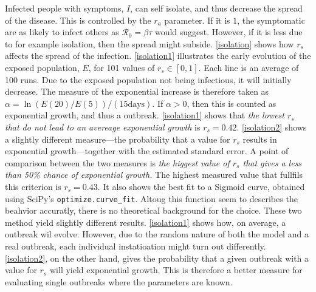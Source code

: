 \documentclass{article}
\begin{document}
    Infected people with symptoms, $I$, can self isolate, and thus decrease the spread of the disease.
    This is controlled by the $r_a$ parameter.
    If it is $1$, the symptomatic are as likely to infect others as $\mathcal{R}_0 = \beta \tau $ would suggest. 
    However, if it is less due to for example isolation, then the spread might subside.
    \autoref{isolation} shows how $r_s$ affects the spread of the infection.
    \autoref{isolation1} illustrates the early evolution of the exposed population, $E$, for 101 values of $r_s\in [0, 1]$.
    Each line is an average of 100 runs.
    Due to the exposed population not being infectious, it will initially decrease.
    The measure of the exponential increase is therefore taken as $\alpha = \ln\left(E(20)/E(5)\right)/(15 \mathrm{days})$.
    If $\alpha>0$, then this is counted as exponential growth, and thus a outbreak.
    \autoref{isolation1} shows that \emph{the lowest $r_s$ that do not lead to an avereage exponential growth} is $r_s = 0.42$.
    \autoref{isolation2} shows a slightly different measure---the probability that a value for $r_s$ results in exponential growth---together with the estimated standard error.
    A point of comparison between the two measures is \emph{the higgest value of $r_s$ that gives a less than 50\% chance of exponential growth.}
    The highest measured value that fullfils this criterion is $r_s = 0.43$.
    It also shows the best fit to a Sigmoid curve, obtained using SciPy's \verb|optimize.curve_fit|.
    Altoug this function seem to describes the beahvior accuratly, there is no theoretical background for the choice.
    These two method yield slightly different results.
    \autoref{isolation1} shows how, on average, a outbreak wil evolve.
    However, due to the random nature of both the model and a real outbreak, each individual instatioation might turn out differently.
    \autoref{isolation2}, on the other hand, gives the probability that a given outbreak with a value for $r_s$ will yield exponential growth.
    This is therefore a better measure for evaluating single outbreaks where the parameters are known.
\end{document}
